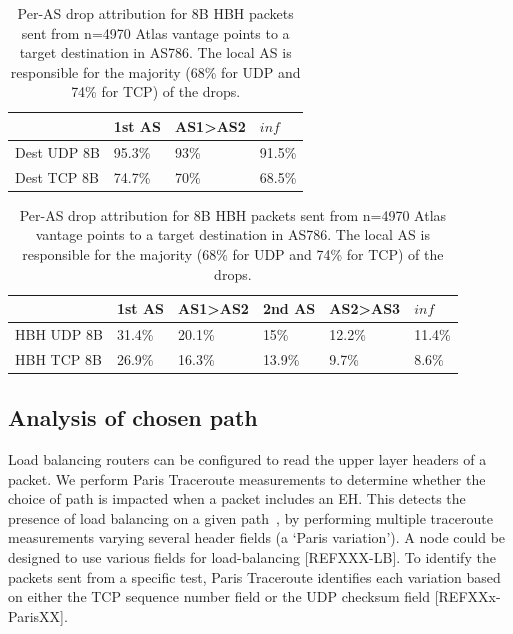 \documentclass[conference]{IEEEtran}
\begin{document}
\begin{table}
\centering
\caption{Per-AS drop attribution for 8B DST packets sent from n=4970 Atlas vantage points to a target destination in AS786. The local AS is responsible for the majority (5\% for UDP and 25\% for TCP) of the drops.}
 \label{tbl:uk_as1}

\begin{tabular}{l|l|l|l}
                                   & 1st AS & AS1\textgreater AS2 & $inf $     \\ \hline 

{Dest UDP 8B} & 95.3\% & 93\%                 & 91.5\% \\ \hline

{Dest TCP 8B} & 74.7\% & 70\%                 & 68.5\%
\end{tabular}
\bigskip
\caption{Per-AS drop attribution for 8B HBH packets sent from n=4970 Atlas vantage points to a target destination in AS786. The local AS is responsible for the majority (68\% for UDP and 74\% for TCP) of the drops.}
\begin{tabular}{p{}|l|l|l|l|l}

              & 1st AS & AS1\textgreater{}AS2 & 2nd AS & AS2\textgreater{}AS3 & $inf$     \\ \hline
HBH UDP 8B & 31.4\% & 20.1\%               & 15\%   & 12.2\%               & 11.4\% \\ \hline
HBH TCP 8B & 26.9\% & 16.3\%               & 13.9\% & 9.7\%                & 8.6\%  \\ 
\end{tabular}
 \label{tbl:uk_as2}
\end{table}


\subsection{Analysis of chosen path}

Load balancing routers can be configured to read the upper layer headers of a packet. We perform Paris Traceroute measurements to determine whether the choice of path is impacted when a packet includes an EH. This detects the presence of load balancing on a given path~\cite{augustin2006avoiding}, by performing multiple traceroute measurements varying several header fields (a `Paris variation'). A node could be designed to use various fields for load-balancing [REFXXX-LB]. To identify the packets sent from a specific test, Paris Traceroute identifies each variation based on either the TCP sequence number field or the UDP checksum field [REFXXx-ParisXX].
\end{document}
